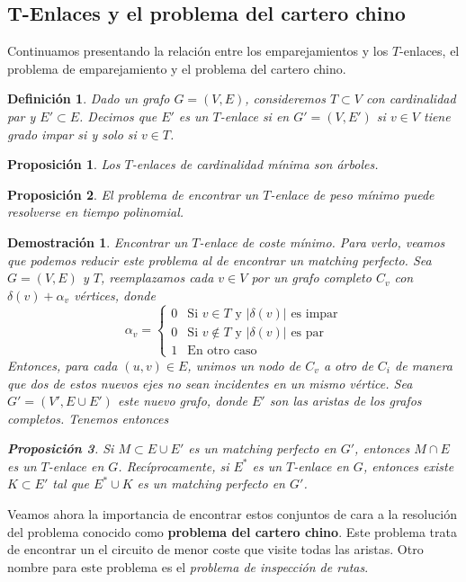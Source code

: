 \documentclass[twoside,a4paper,openright,12pt,tikz]{book}
\newtheorem{defi}{Definici\'on}[section]
\newtheorem{prop}{Proposici\'on}[section]
\newtheorem*{dem}{Demostración}
\begin{document}
\subsection{T-Enlaces y el problema del cartero chino}
Continuamos presentando la relación entre los emparejamientos y los $T$-enlaces, el problema de emparejamiento y el problema del cartero chino.
\begin{defi}
Dado un grafo $G=(V,E)$, consideremos $T\subset V$ con cardinalidad par y $E'\subset E$. Decimos que $E'$ es un $T$-enlace si en $G'=(V,E')$ si $v\in V$ tiene grado impar si y solo si $v\in T$.
\end{defi}
\begin{prop}
Los $T$-enlaces de cardinalidad mínima son árboles.
\end{prop}
\begin{prop}
El problema de encontrar un $T$-enlace de peso mínimo puede resolverse en tiempo polinomial.
\end{prop}
\begin{dem}
Encontrar un $T$-enlace de coste mínimo. Para verlo, veamos que podemos reducir este problema al de encontrar un matching perfecto. Sea $G=(V,E)$ y $T$, reemplazamos cada $v\in V$ por un grafo completo $C_v$ con $\delta(v)+\alpha_v$ vértices, donde
$$
\alpha_v = \begin{cases}
0 & \text{Si $v\in T$ y $|\delta(v)|$ es impar}\\
0 & \text{Si $v\notin T$ y $|\delta(v)|$ es par}\\
1 & \text{En otro caso}
\end{cases}
$$
Entonces, para cada $(u,v)\in E$, unimos un nodo de $C_v$ a otro de $C_i$ de manera que dos de estos nuevos ejes no sean incidentes en un mismo vértice. Sea $G'=(V',E\cup E')$ este nuevo grafo, donde $E'$ son las aristas de los grafos completos. Tenemos entonces
\begin{prop}
Si $M\subset E\cup E'$ es un matching perfecto en $G'$, entonces $M\cap E$ es un $T$-enlace en $G$. Recíprocamente, si $E^*$ es un $T$-enlace en $G$, entonces existe $K\subset E'$ tal que $E^*\cup K$ es un matching perfecto en $G'$.
\end{prop}
\end{dem}
Veamos ahora la importancia de encontrar estos conjuntos de cara a la resolución del problema conocido como \textbf{problema del cartero chino}. Este problema trata de encontrar un el circuito de menor coste que visite todas las aristas. Otro nombre para este problema es el \textit{problema de inspección de rutas}. 
\end{document}
